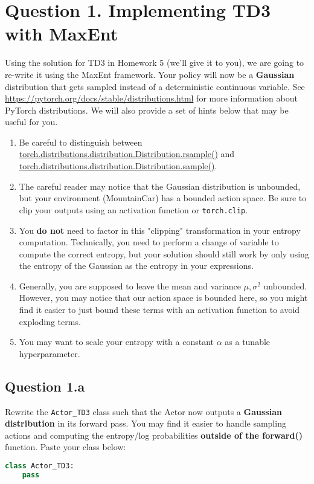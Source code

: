 \documentclass[12pt]{article}
\begin{document}
\section*{Question 1. Implementing TD3 with MaxEnt}
Using the solution for TD3 in Homework 5 (we'll give it to you), we are going to re-write it using the MaxEnt framework. Your policy will now be a \textbf{Gaussian} distribution that gets sampled instead of a deterministic continuous variable. See \url{https://pytorch.org/docs/stable/distributions.html} for more information about PyTorch distributions. We will also provide a set of hints below that may be useful for you.
\begin{enumerate}
    \item Be careful to distinguish between \href{https://pytorch.org/docs/stable/distributions.html#torch.distributions.distribution.Distribution.rsample}{torch.distributions.distribution.Distribution.rsample()} and \href{https://pytorch.org/docs/stable/distributions.html#torch.distributions.distribution.Distribution.sample}{torch.distributions.distribution.Distribution.sample()}.
    \item The careful reader may notice that the Gaussian distribution is unbounded, but your environment (MountainCar) has a bounded action space. Be sure to clip your outputs using an activation function or \texttt{torch.clip}.
    \item You \textbf{do not} need to factor in this "clipping" transformation in your entropy computation. Technically, you need to perform a change of variable to compute the correct entropy, but your solution should still work by only using the entropy of the Gaussian as the entropy in your expressions.
    \item Generally, you are supposed to leave the mean and variance $\mu, \sigma^2$ unbounded. However, you may notice that our action space is bounded here, so you might find it easier to just bound these terms with an activation function to avoid exploding terms.
    \item You may want to scale your entropy with a constant $\alpha$ as a tunable hyperparameter.
\end{enumerate}

\subsection*{Question 1.a} 
Rewrite the \texttt{Actor\_TD3} class such that the Actor now outputs a \textbf{Gaussian distribution} in its forward pass. You may find it easier to handle sampling actions and computing the entropy/log probabilities \textbf{outside of the forward()} function.
Paste your class below:
\begin{solution}
\begin{lstlisting}[language=Python]
class Actor_TD3:
    pass
\end{lstlisting}
\end{solution}
\end{document}
